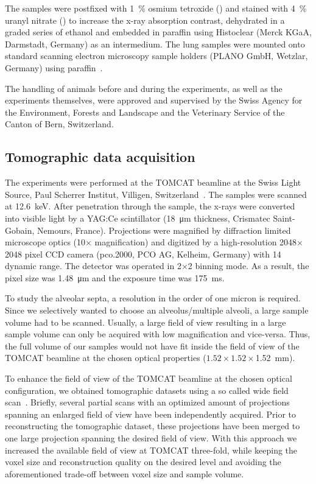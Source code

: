\documentclass[%
	paper=a4,%
	DIV=calc,%
	twoside=true,%
	draft=true,%
	abstract=false]{scrartcl}
\begin{document}
The samples were postfixed with \SI{1}{\percent} osmium tetroxide () and stained with \SI{4}{\percent} uranyl nitrate () to increase the x-ray absorption contrast, dehydrated in a graded series of ethanol and embedded in paraffin using Histoclear (Merck KGaA, Darmstadt, Germany) as an intermedium. The lung samples were mounted onto standard scanning electron microscopy sample holders (PLANO GmbH, Wetzlar, Germany) using paraffin~\cite{Tsuda2008}.

The handling of animals before and during the experiments, as well as the experiments themselves, were approved and supervised by the Swiss Agency for the Environment, Forests and Landscape and the Veterinary Service of the Canton of Bern, Switzerland.

\subsection{Tomographic data acquisition}
The experiments were performed at the TOMCAT beamline at the Swiss Light Source, Paul Scherrer Institut, Villigen, Switzerland~\cite{Stampanoni2006a}. The samples were scanned at \SI{12.6}{\kilo\electronvolt}. After penetration through the sample, the x-rays were converted into visible light by a YAG:Ce scintillator (\SI{18}{\micro\meter} thickness, Crismatec Saint-Gobain, Nemours, France). Projections were magnified by diffraction limited microscope optics (10\(\times\) magnification) and digitized by a high-resolution 2048\(\times\)2048 pixel CCD camera (pco.2000, PCO AG, Kelheim, Germany) with \SI{14}{\bit} dynamic range. The detector was operated in 2\(\times\)2 binning mode. As a result, the pixel size was \SI{1.48}{\micro\meter} and the exposure time was \SI{175}{\milli\second}.

To study the alveolar septa, a resolution in the order of one micron is required. Since we selectively wanted to choose an alveolus/multiple alveoli, a large sample volume had to be scanned. Usually, a large field of view resulting in a large sample volume can only be acquired with low magnification and vice-versa. Thus, the full volume of our samples would not have fit inside the field of view of the TOMCAT beamline at the chosen optical properties (\(1.52\times1.52\times\)\SI{1.52}{\milli\meter}).

To enhance the field of view of the TOMCAT beamline at the chosen optical configuration, we obtained tomographic datasets using a so called wide field scan~\cite{Haberthuer2010}. Briefly, several partial scans with an optimized amount of projections spanning an enlarged field of view have been independently acquired. Prior to reconstructing the tomographic dataset, these projections have been merged to one large projection spanning the desired field of view. With this approach we increased the available field of view at TOMCAT three-fold, while keeping the voxel size and reconstruction quality on the desired level and avoiding the aforementioned trade-off between voxel size and sample volume.
\end{document}
